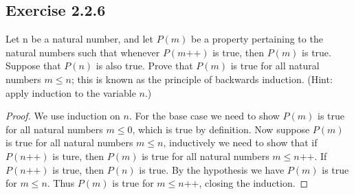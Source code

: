 \documentclass[a4paper]{article}
\begin{document}
\subsection*{Exercise 2.2.6}

Let n be a natural number, and let $P(m)$ be a property pertaining to the natural numbers such that whenever $P(m\text{++})$ is true, then $P(m)$ is true. Suppose that $P(n)$ is also true. Prove that $P(m)$ is true for all natural numbers $m \le n$; this is known as the principle of backwards induction. (Hint: apply induction to the variable $n$.)

\begin{proof}

We use induction on $n$. For the base case we need to show  $P(m)$ is true for all natural numbers  $m \le 0$, which is true by definition. Now suppose $P(m)$ is true for all natural numbers  $m \le n$, inductively we need to show that if $P\left( n\text{++} \right) $ is ture, then $P(m)$  is true for all natural numbers $m \le n\text{++}$. If $P(n\text{++})$ is true, then $P(n)$ is true. By the hypothesis we have  $P(m) $ is true for  $m \le n$. Thus $P(m)$ is true for  $m \le n\text{++}$, closing the induction.

\end{proof}
\end{document}
